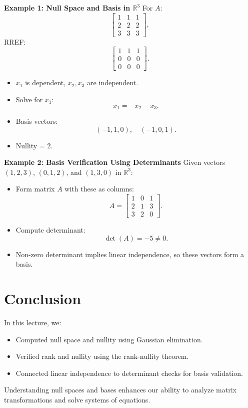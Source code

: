 \documentclass{article}
\begin{document}
\textbf{Example 1: Null Space and Basis in $\mathbb{R}^3$}
For $A$:
\[
  \begin{bmatrix}
    1 & 1 & 1 \\
    2 & 2 & 2 \\
    3 & 3 & 3
  \end{bmatrix},
\]
RREF:
\[
  \begin{bmatrix}
    1 & 1 & 1 \\
    0 & 0 & 0 \\
    0 & 0 & 0
  \end{bmatrix}.
\]
\begin{itemize}
  \item $x_1$ is dependent, $x_2, x_3$ are independent.
  \item Solve for $x_1$:
    \[
      x_1 = -x_2 - x_3.
    \]
  \item Basis vectors:
    \[
      (-1, 1, 0), \quad (-1, 0, 1).
    \]
  \item Nullity = 2.
\end{itemize}

\textbf{Example 2: Basis Verification Using Determinants}
Given vectors $(1, 2, 3)$, $(0, 1, 2)$, and $(1, 3, 0)$ in $\mathbb{R}^3$:
\begin{itemize}
  \item Form matrix $A$ with these as columns:
    \[
      A =
      \begin{bmatrix}
        1 & 0 & 1 \\
        2 & 1 & 3 \\
        3 & 2 & 0
      \end{bmatrix}.
    \]
  \item Compute determinant:
    \[
      \det(A) = -5 \neq 0.
    \]
  \item Non-zero determinant implies linear independence, so these vectors form a basis.
\end{itemize}

\section*{Conclusion}

In this lecture, we:
\begin{itemize}
  \item Computed null space and nullity using Gaussian elimination.
  \item Verified rank and nullity using the rank-nullity theorem.
  \item Connected linear independence to determinant checks for basis validation.
\end{itemize}

Understanding null spaces and bases enhances our ability to analyze matrix transformations and solve systems of equations.
\end{document}
